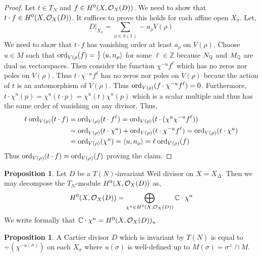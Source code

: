 \documentclass[12pt]{extarticle}
\newcommand{\Z}{\mathbb{Z}}
\newcommand{\C}{\mathbb{C}}
\theoremstyle{definition}
\newtheorem{proposition}[theorem]{Proposition}
\newcommand{\inner}[2]{\left< #1, #2 \right>}
\begin{document}
\begin{proof}
Let $t \in T_N$ and $f \in H^0(X, \mathcal{O}_{X}(D))$. We need to show that $t \cdot f \in H^0(X, \mathcal{O}_{X}(D))$. It suffices to prove this holds for each affine open $X_\sigma$. Let,
\[ D|_{X_\sigma} = \sum_{\rho \in \sigma(1)} - a_\rho V(\rho) \]
We need to show that $t \cdot f$ has vanishing order at least $a_\rho$ on $V(\rho)$. Choose $u \in M$ such that $\ord_{V(\rho}(f) = \frac{1}{\ell} \inner{u}{n_\rho}$ for some $\ell \in \Z$ because $N_{\mathbb{Q}}$ and $M_{\mathbb{Q}}$ are dual as vectorspaces. Then consider the function $\chi^{-u} f^\ell$ which has no zeros nor poles on $V(\rho)$. Thus $t \cdot \chi^{-u} f^\ell$ has no zeros nor poles on $V(\rho)$ becaue the action of $t$ is an automorphism of $V(\rho)$. Thus $\mathrm{ord}_{V(\rho)}(f \cdot \chi^{-u} f^\ell) = 0$. Furthermore, $t \cdot \chi^u(p) = \chi^u(t \cdot p) = \chi^u(t) \chi^u(p)$ which is a scalar multiple and thus has the same order of vanishing on any divisor. Thus,
\begin{align*}
\ell \: \ord_{V(\rho)}(t \cdot f) & = \ord_{V(\rho)}(t \cdot f^\ell) = \ord_{V(\rho)}(t \cdot (\chi^u \chi^{-u} f^\ell))
\\
& = \ord_{V(\rho)}(t \cdot \chi^u) + \ord_{V(\rho)}(t \cdot \chi^{-u} f^\ell) 
= \ord_{V(\rho)}(t \cdot \chi^u) 
\\
& = \ord_{V(\rho)}(\chi^u) = \inner{u}{n_\rho} = \ell \: \ord_{V(\rho)}(f)
\end{align*}
Thus $\mathrm{ord}_{V(\rho)}(t \cdot f) = \mathrm{ord}_{V(\rho)}(f)$ proving the claim. 
\end{proof}

\begin{proposition}
Let $D$ be a $T(N)$-invariant Weil divisor on $X = X_\Delta$. Then we may decompose the $T_N$-module $H^0(X, \mathcal{O}_{X}(D))$ as,
\[ H^0(X, \struct{X}(D)) = \bigoplus_{\chi^u \in H^0(X, \struct{X}(D))} \C \cdot \chi^u \]
We write formally that $\C \cdot \chi^u = H^0(X, \struct{X}(D))_u$. 
\end{proposition}

\begin{proposition}
A Cartier divisor $D$ which is invariant by $T(N)$ is equal to $\div(\chi^{-u(\sigma)})$ on each $X_\sigma$ where $u(\sigma)$ is well-defined up to $M(\sigma) = \sigma^\perp \cap M$. 
\end{proposition}
\end{document}
